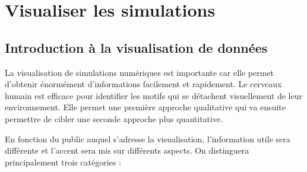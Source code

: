 \part{Visualiser les  simulations}

\chapter{Introduction à la visualisation de données}
\label{sec:visu}

La visualisation de simulations numériques est importante car elle permet d'obtenir énormément d'informations facilement et rapidement.
Le cerveaux humain est efficace pour identifier les motifs qui se détachent visuellement de leur environnement.
Elle permet une première approche qualitative qui va ensuite permettre de cibler une seconde approche plus quantitative.



En fonction du public auquel s'adresse la visualisation, l'information utile sera différente et l'accent sera mis sur différents aspects.
On distinguera principalement trois catégories :

